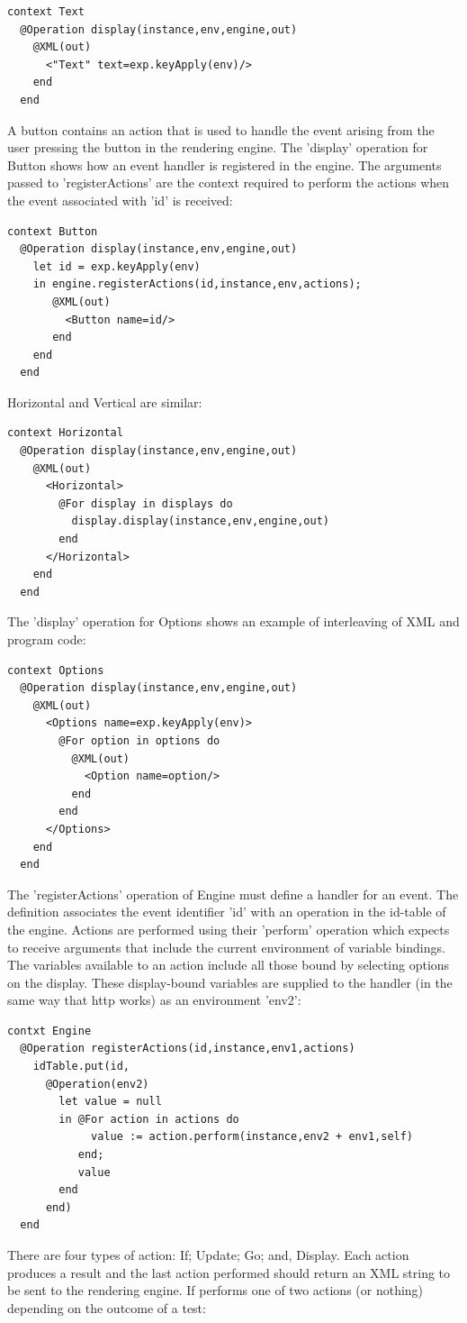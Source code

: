 \begin{lstlisting}
context Text
  @Operation display(instance,env,engine,out)
    @XML(out)
      <"Text" text=exp.keyApply(env)/>
    end
  end
\end{lstlisting}A button contains an action that is used to handle the event arising
from the user pressing the button in the rendering engine. The 'display'
operation for Button shows how an event handler is registered in the
engine. The arguments passed to 'registerActions' are the context
required to perform the actions when the event associated with 'id'
is received:

\begin{lstlisting}
context Button
  @Operation display(instance,env,engine,out)
    let id = exp.keyApply(env)
    in engine.registerActions(id,instance,env,actions);
       @XML(out)
         <Button name=id/>
       end
    end
  end
\end{lstlisting}Horizontal and Vertical are similar:

\begin{lstlisting}
context Horizontal
  @Operation display(instance,env,engine,out)
    @XML(out)
      <Horizontal>
        @For display in displays do
          display.display(instance,env,engine,out)
        end
      </Horizontal>
    end
  end
\end{lstlisting}\newpage{}

The 'display' operation for Options shows an example of interleaving
of XML and program code:

\begin{lstlisting}
context Options
  @Operation display(instance,env,engine,out)
    @XML(out)
      <Options name=exp.keyApply(env)>
        @For option in options do
          @XML(out)
            <Option name=option/>
          end
        end
      </Options>
    end
  end
\end{lstlisting}The 'registerActions' operation of Engine must define a handler for
an event. The definition associates the event identifier 'id' with
an operation in the id-table of the engine. Actions are performed
using their 'perform' operation which expects to receive arguments
that include the current environment of variable bindings. The variables
available to an action include all those bound by selecting options
on the display. These display-bound variables are supplied to the
handler (in the same way that http works) as an environment 'env2':

\begin{lstlisting}
contxt Engine
  @Operation registerActions(id,instance,env1,actions)
    idTable.put(id,
      @Operation(env2)
        let value = null
        in @For action in actions do
             value := action.perform(instance,env2 + env1,self)
           end;
           value
        end
      end)
  end
\end{lstlisting}There are four types of action: If; Update; Go; and, Display. Each
action produces a result and the last action performed should return
an XML string to be sent to the rendering engine. If performs one
of two actions (or nothing) depending on the outcome of a test:

